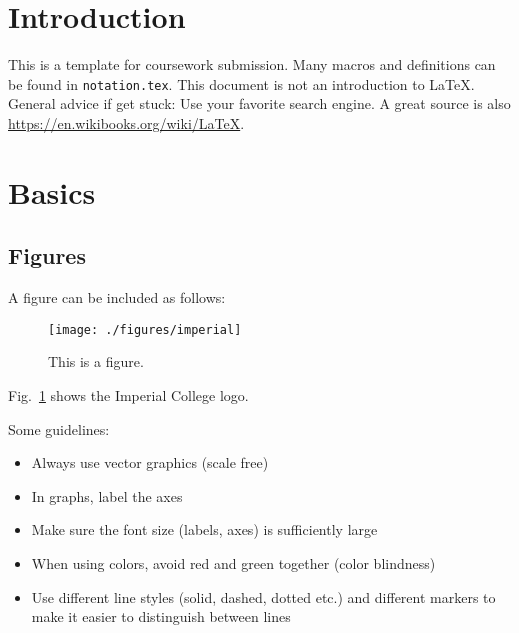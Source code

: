 \documentclass[12pt,twoside]{article}
\begin{document}
	
	
	
	\section{Introduction}
	This is a template for coursework submission. Many macros and definitions can be found in \texttt{notation.tex}. This document is not an introduction to LaTeX. General advice if get stuck: Use your favorite search engine. A great source is also \mbox{\url{https://en.wikibooks.org/wiki/LaTeX}}.
	
	\section{Basics}
	
	\subsection{Figures}
	A figure can be included as follows:
	\begin{figure}[tb]
		\centering %
		\texttt{[image: ./figures/imperial]} %
		\caption{This is a figure.} %
		\label{fig:imperial figure} %
	\end{figure}
	Fig.~\ref{fig:imperial figure} shows the Imperial College logo. 
	
	Some guidelines:
	\begin{itemize}
		\item Always use vector graphics (scale free)
		\item In graphs, label the axes
		\item Make sure the font size (labels, axes) is sufficiently large
		\item When using colors, avoid red and green together (color blindness)
		\item Use different line styles (solid, dashed, dotted etc.) and different markers to make it easier to distinguish between lines
	\end{itemize}
	
\end{document}
